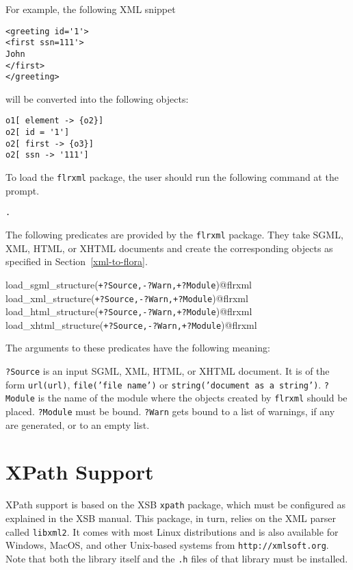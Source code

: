 For example, the following XML snippet

\begin{verbatim}
<greeting id='1'>
<first ssn=111'>
John
</first>
</greeting>
\end{verbatim}

will be converted into the following \FLSYSTEM objects:

\begin{verbatim}
o1[ element -> {o2}]
o2[ id = '1']
o2[ first -> {o3}]
o2[ ssn -> '111']
\end{verbatim}

To load the {\tt flrxml} package, the user should run the
following command at the \FLSYSTEM prompt.

\begin{alltt}
  \prompt [flrxml]. 
\end{alltt}

The following predicates are provided by the {\tt flrxml} package.  They
take SGML, XML, HTML, or XHTML documents and create the corresponding
\FLSYSTEM objects as specified in Section~\ref{xml-to-flora}.

\begin{description}
\item [load\_sgml\_structure({\tt +?Source,-?Warn,+?Module})@flrxml]
\item[load\_xml\_structure({\tt +?Source,-?Warn,+?Module})@flrxml]
\item[load\_html\_structure({\tt +?Source,-?Warn,+?Module})@flrxml]
\item[load\_xhtml\_structure({\tt +?Source,-?Warn,+?Module})@flrxml]
\end{description}
The arguments to these predicates have the following meaning:

{\tt ?Source} is an input SGML, XML, HTML, or XHTML document.
It is of the form {\tt url({\tt {url}})},
{\tt file('{\tt {file name}}')} or {\tt string('{\tt document as a string}')}. 
{\tt ?Module} is the name of the \FLSYSTEM module where the objects created
by {\tt flrxml}  should be placed. {\tt ?Module}  must be bound.
{\tt ?Warn} gets bound to a list of warnings, if any are generated, or to
an empty list.
  

\section{XPath Support}

XPath support is based on the XSB {\tt xpath} package, which must be
configured as explained in the XSB manual. This package, in turn, relies on
the XML parser called {\tt libxml2}. It comes with most Linux
distributions and is also available for Windows, MacOS, and other
Unix-based systems from {\tt http://xmlsoft.org}. 
Note that both the library itself and the {\tt .h} files of that
library must be installed. 

